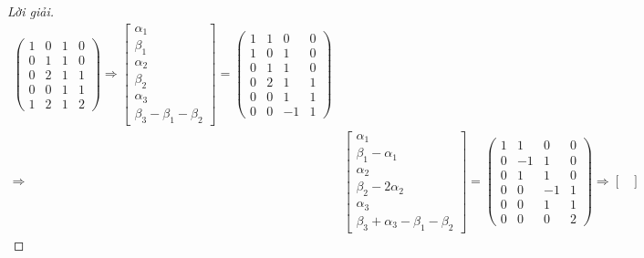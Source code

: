 \documentclass[class=linear-algebra,crop=false]{standalone}
\begin{document}
\begin{proof}[Lời giải]
\begin{align*}
\begin{pmatrix}
            1 & 0 & 1 & 0 \\
            0 & 1 & 1 & 0 \\
            0 & 2 & 1 & 1 \\
            0 & 0 & 1 & 1 \\
            1 & 2 & 1 & 2
        \end{pmatrix}
        \Longrightarrow
        \begin{bmatrix}
            \alpha_{1} \\
            \beta_{1}  \\
            \alpha_{2} \\
            \beta_{2}  \\
            \alpha_{3} \\
            \beta_{3} - \beta_{1} - \beta_{2}
        \end{bmatrix}=
        \begin{pmatrix}
            1 & 1 & 0  & 0 \\
            1 & 0 & 1  & 0 \\
            0 & 1 & 1  & 0 \\
            0 & 2 & 1  & 1 \\
            0 & 0 & 1  & 1 \\
            0 & 0 & -1 & 1
        \end{pmatrix}                   \\
        \Longrightarrow &
        \begin{bmatrix}
            \alpha_{1}              \\
            \beta_{1} - \alpha_{1}  \\
            \alpha_{2}              \\
            \beta_{2} - 2\alpha_{2} \\
            \alpha_{3}              \\
            \beta_{3} + \alpha_{3} - \beta_{1} - \beta_{2}
        \end{bmatrix}=
        \begin{pmatrix}
            1 & 1  & 0  & 0 \\
            0 & -1 & 1  & 0 \\
            0 & 1  & 1  & 0 \\
            0 & 0  & -1 & 1 \\
            0 & 0  & 1  & 1 \\
            0 & 0  & 0  & 2
        \end{pmatrix}
        \Longrightarrow
        \begin{bmatrix}

\end{bmatrix}
\end{align*}
\end{proof}
\end{document}
